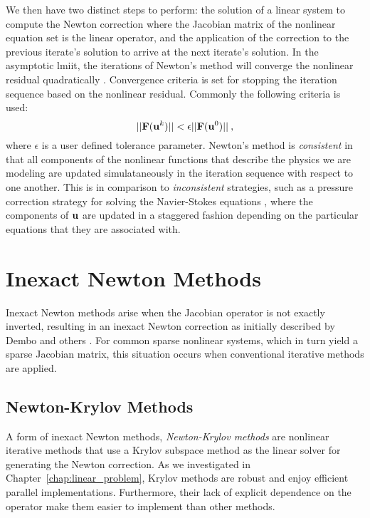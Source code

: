 We then have two distinct steps to perform: the solution of a linear
system to compute the Newton correction where the Jacobian matrix of
the nonlinear equation set is the linear operator, and the application
of the correction to the previous iterate's solution to arrive at the
next iterate's solution. In the asymptotic lmiit, the iterations of
Newton's method will converge the nonlinear residual quadratically
\citep{kelley_iterative_1995}. Convergence criteria is set for
stopping the iteration sequence based on the nonlinear
residual. Commonly the following criteria is used:
\begin{equation}
  ||\mathbf{F}(\mathbf{u}^{k})|| < \epsilon ||\mathbf{F}(\mathbf{u}^{0})||\:,
  \label{eq:newton_stopping_criteria}
\end{equation}
where $\epsilon$ is a user defined tolerance parameter. Newton's
method is \textit{consistent} in that all components of the nonlinear
functions that describe the physics we are modeling are updated
simulataneously in the iteration sequence with respect to one
another. This is in comparison to \textit{inconsistent} strategies,
such as a pressure correction strategy for solving the Navier-Stokes
equations \citep{pletcher_computational_1997}, where the components of
$\mathbf{u}$ are updated in a staggered fashion depending on the
particular equations that they are associated with.

\section{Inexact Newton Methods}
\label{sec:newton_methods}
Inexact Newton methods arise when the Jacobian operator is not exactly
inverted, resulting in an inexact Newton correction as initially
described by Dembo and others \citep{dembo_inexact_1982}. For common
sparse nonlinear systems, which in turn yield a sparse Jacobian
matrix, this situation occurs when conventional iterative methods are
applied.

\subsection{Newton-Krylov Methods}
\label{subsec:newton_krylov_methods}
A form of inexact Newton methods, \textit{Newton-Krylov methods} are
nonlinear iterative methods that use a Krylov subspace method as the
linear solver for generating the Newton correction. As we investigated
in Chapter~\ref{chap:linear_problem}, Krylov methods are robust and
enjoy efficient parallel implementations. Furthermore, their lack of
explicit dependence on the operator make them easier to implement than
other methods. 

